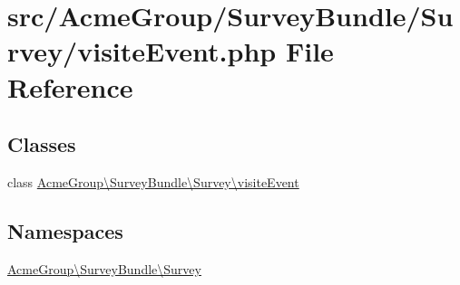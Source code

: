 \hypertarget{visite_event_8php}{\section{src/\+Acme\+Group/\+Survey\+Bundle/\+Survey/visite\+Event.php File Reference}
\label{visite_event_8php}
}
\subsection*{Classes}
\begin{DoxyCompactItemize}
\item 
class \hyperlink{class_acme_group_1_1_survey_bundle_1_1_survey_1_1visite_event}{Acme\+Group\textbackslash{}\+Survey\+Bundle\textbackslash{}\+Survey\textbackslash{}visite\+Event}
\end{DoxyCompactItemize}
\subsection*{Namespaces}
\begin{DoxyCompactItemize}
\item 
 \hyperlink{namespace_acme_group_1_1_survey_bundle_1_1_survey}{Acme\+Group\textbackslash{}\+Survey\+Bundle\textbackslash{}\+Survey}
\end{DoxyCompactItemize}

